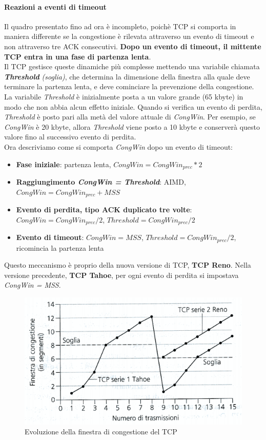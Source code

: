\documentclass[11pt,a4paper]{book}
\begin{document}
\paragraph{Reazioni a eventi di timeout}
Il quadro presentato fino ad ora è incompleto, poichè TCP si comporta in maniera differente se la congestione è rilevata attraverso un evento di timeout e non attraverso tre ACK consecutivi. \textbf{Dopo un evento di timeout, il mittente TCP entra in una fase di partenza lenta}. \\
Il TCP gestisce queste dinamiche più complesse mettendo una variabile chiamata \textbf{\emph{Threshold}} \textit{(soglia)}, che determina la dimensione della finestra alla quale deve terminare la partenza lenta, e deve cominciare la prevenzione della congestione. La variabile \emph{Threshold} è inizialmente posta a un valore grande (65 kbyte) in modo che non abbia alcun effetto iniziale. Quando si verifica un evento di perdita, \emph{Threshold} è posto pari alla metà del valore attuale di \emph{CongWin}. Per esempio, se \emph{CongWin} è 20 kbyte, allora \emph{Threshold} viene posto a 10 kbyte e conserverà questo valore fino al successivo evento di perdita. \\
Ora descriviamo come si comporta \emph{CongWin} dopo un evento di timeout:
\begin{itemize}
	\item \textbf{Fase iniziale}: partenza lenta, $CongWin = CongWin_{prec}*2$
	\item \textbf{Raggiungimento \emph{CongWin = Threshold}}: AIMD, $CongWin = CongWin_{prec} + MSS$
	\item \textbf{Evento di perdita, tipo ACK duplicato tre volte}: $CongWin = CongWin_{prec}/2$, $Threshold = CongWin_{prec}/2$
	\item \textbf{Evento di timeout}: $CongWin = MSS$, $Threshold = CongWin_{prec}/2$, ricomincia la partenza lenta
\end{itemize}
Questo meccanismo è proprio della nuova versione di TCP, \textbf{TCP Reno}. Nella versione precedente, \textbf{TCP Tahoe}, per ogni evento di perdita si impostava \emph{CongWin = MSS}.
\begin{figure}
	\includegraphics[scale=0.6]{img/046.png}
	\caption{Evoluzione della finestra di congestione del TCP}
\end{figure}
\end{document}
